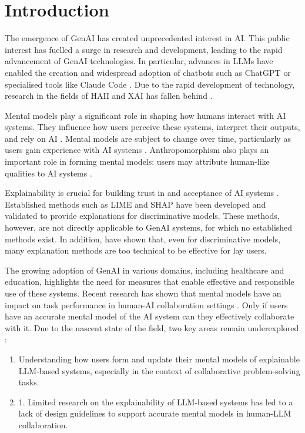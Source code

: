 \section{Introduction} \label{sec:introduction}

The emergence of \ac{GenAI} has created unprecedented interest in \ac{AI}. This public interest has fuelled a surge in research and development, leading to the rapid advancement of \ac{GenAI} technologies. In particular, advances in \acp{LLM} have enabled the creation and widespread adoption of chatbots such as ChatGPT \parencite{OpenAI2025a} or specialised tools like Claude Code \parencite{AnthropicInc2026}. Due to the rapid development of technology, research in the fields of \ac{HAII} and \ac{XAI} has fallen behind \parencite{Adadi2018}.

Mental models play a significant role in shaping how humans interact with \ac{AI} systems. They influence how users perceive these systems, interpret their outputs, and rely on \ac{AI} \parencite{Miller2019,Bodamer2026}. Mental models are subject to change over time, particularly as users gain experience with \ac{AI} systems \parencite{Schneider2025}. Anthropomorphism also plays an important role in forming mental models: users may attribute human-like qualities to \ac{AI} systems \parencite{Bodamer2026}.

Explainability is crucial for building trust in and acceptance of \ac{AI} systems \parencite{Arrieta2020}. Established methods such as \acs{LIME} \parencite{Ribeiro2016} and \acs{SHAP} \parencite{Lundberg2017} have been developed and validated to provide explanations for discriminative models. These methods, however, are not directly applicable to \ac{GenAI} systems, for which no established methods exist. In addition, \textcite{Bienefeld2023} have shown that, even for discriminative models, many explanation methods are too technical to be effective for lay users.

The growing adoption of \ac{GenAI} in various domains, including healthcare and education, highlights the need for measures that enable effective and responsible use of these systems. Recent research has shown that mental models have an impact on task performance in human-AI collaboration settings \parencite{Jussupow2021}. Only if users have an accurate mental model of the \ac{AI} system can they effectively collaborate with it. Due to the nascent state of the field, two key areas remain underexplored \parencite{Bodamer2026,Weisz2025}:

\begin{enumerate}
    \item Understanding how users form and update their mental models of explainable \ac{LLM}-based systems, especially in the context of collaborative problem-solving tasks.
    \item 1. Limited research on the explainability of \ac{LLM}-based systems has led to a lack of design guidelines to support accurate mental models in human-\ac{LLM} collaboration.
\end{enumerate}

